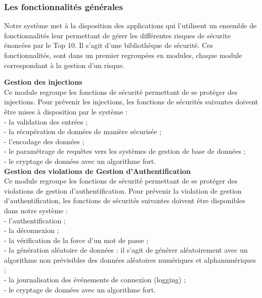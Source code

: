 \subsubsection{Les fonctionnalités générales}
Notre système met à la disposition des applications qui l'utilisent un ensemble de fonctionnalités leur permettant de gérer les différentes risques de sécurite énoncées par le Top 10. Il s'agit d'une bibliothèque de sécurité. Ces fonctionnalités, sont dans un premier regroupées en modules, chaque module correspondant à la gestion d'un risque.

\textbf{\RIGHTarrow Gestion des injections}\\
Ce module regroupe les fonctions de sécurité permettant de se protéger des injections. Pour prévenir les injections, les fonctions de sécurités suivantes doivent être mises à disposition par le système : \\
- la validation des entrées ; \\
- la récupération de données de manière sécurisée ; \\
- l’encodage des données ; \\
- le paramétrage de requêtes vers les systèmes de gestion de base de données ; \\
- le cryptage de données avec un algorithme fort.\\

\textbf{\RIGHTarrow Gestion des violations de Gestion d’Authentification}\\
Ce module regroupe les fonctions de sécurité permettant de se protéger des violations de gestion d'authentification. Pour prévenir la violation de gestion d'authentification, les fonctions de sécurités suivantes doivent être disponibles dans notre système : \\
- l'authentification ;\\
- la déconnexion ;\\
- la vérification de la force d'un mot de passe ; \\
- la génération aléatoire de données : il s'agit de générer aléatoirement avec un algorithme non prévisibles des données aléatoires numériques et alphanumériques ; \\ 
- la journalisation des événements de connexion (logging) ; \\
- le cryptage de données avec un algorithme fort.\\

